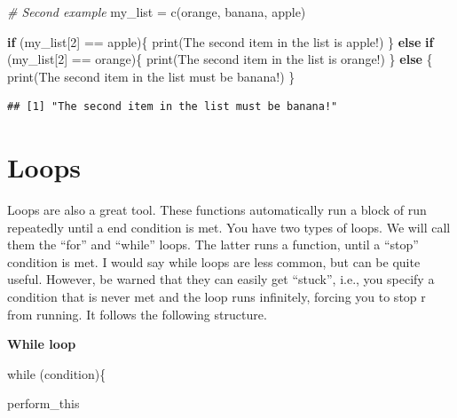 \documentclass[
]{book}
\newenvironment{Shaded}{\begin{snugshade}}{\end{snugshade}}
\newcommand{\CommentTok}[1]{\textcolor[rgb]{0.56,0.35,0.01}{\textit{#1}}}
\newcommand{\ControlFlowTok}[1]{\textcolor[rgb]{0.13,0.29,0.53}{\textbf{#1}}}
\newcommand{\DecValTok}[1]{\textcolor[rgb]{0.00,0.00,0.81}{#1}}
\newcommand{\FunctionTok}[1]{\textcolor[rgb]{0.00,0.00,0.00}{#1}}
\newcommand{\NormalTok}[1]{#1}
\newcommand{\OtherTok}[1]{\textcolor[rgb]{0.56,0.35,0.01}{#1}}
\newcommand{\SpecialCharTok}[1]{\textcolor[rgb]{0.00,0.00,0.00}{#1}}
\newcommand{\StringTok}[1]{\textcolor[rgb]{0.31,0.60,0.02}{#1}}
\begin{document}
\begin{Shaded}
\begin{Highlighting}[]
\CommentTok{\# Second example}
\NormalTok{my\_list }\OtherTok{=} \FunctionTok{c}\NormalTok{(}\StringTok{\textquotesingle{}orange\textquotesingle{}}\NormalTok{, }\StringTok{\textquotesingle{}banana\textquotesingle{}}\NormalTok{, }\StringTok{\textquotesingle{}apple\textquotesingle{}}\NormalTok{)}

\ControlFlowTok{if}\NormalTok{ (my\_list[}\DecValTok{2}\NormalTok{] }\SpecialCharTok{==} \StringTok{\textquotesingle{}apple\textquotesingle{}}\NormalTok{)\{}
  \FunctionTok{print}\NormalTok{(}\StringTok{\textquotesingle{}The second item in the list is apple!\textquotesingle{}}\NormalTok{)}
\NormalTok{\} }\ControlFlowTok{else} \ControlFlowTok{if}\NormalTok{ (my\_list[}\DecValTok{2}\NormalTok{] }\SpecialCharTok{==} \StringTok{\textquotesingle{}orange\textquotesingle{}}\NormalTok{)\{}
  \FunctionTok{print}\NormalTok{(}\StringTok{\textquotesingle{}The second item in the list is orange!\textquotesingle{}}\NormalTok{)}
\NormalTok{\} }\ControlFlowTok{else}\NormalTok{ \{}
  \FunctionTok{print}\NormalTok{(}\StringTok{\textquotesingle{}The second item in the list must be banana!\textquotesingle{}}\NormalTok{)}
\NormalTok{\}}
\end{Highlighting}
\end{Shaded}

\begin{verbatim}
## [1] "The second item in the list must be banana!"
\end{verbatim}

\hypertarget{loops}{%
\section{Loops}\label{loops}}

Loops are also a great tool.
These functions automatically run a block of run repeatedly until a end condition is met.
You have two types of loops.
We will call them the ``for'' and ``while'' loops.
The latter runs a function, until a ``stop'' condition is met.
I would say while loops are less common, but can be quite useful.
However, be warned that they can easily get ``stuck'', i.e., you specify a condition that is never met and the loop runs infinitely, forcing you to stop r from running.
It follows the following structure.

\textbf{While loop}

while (condition)\{

perform\_this
\end{document}
